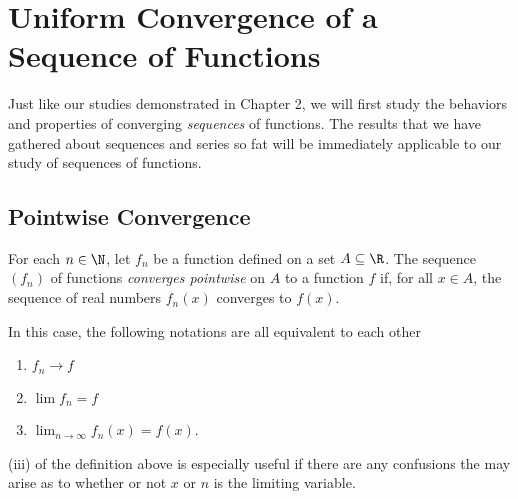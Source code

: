 \section{Uniform Convergence of a Sequence of Functions}


Just like our studies demonstrated in Chapter 2, we will first study the behaviors and properties of converging \textit{sequences} of functions. The results that we have gathered about sequences and series so fat will be immediately applicable to our study of sequences of functions.

\subsection{Pointwise Convergence} 

\begin{tcolorbox}
\begin{defn}
For each \( n \in \N  \), let \( f_n \) be a function defined on a set \( A \subseteq \R  \). The sequence \( (f_n)  \) of functions \textit{converges pointwise }  on \( A  \) to a function \( f  \) if, for all \( x \in A  \), the sequence of real numbers \( f_n(x)  \) converges to \( f(x)  \). 

In this case, the following notations are all equivalent to each other
\begin{enumerate}
    \item[(i)] \( f_n \to f  \) 
    \item[(ii)] \( \lim f_n = f  \)
    \item[(iii)] \( \lim_{ n \to \infty  } f_n(x) = f(x)  \).
\end{enumerate}
\end{defn}
\end{tcolorbox}

(iii) of the definition above is especially useful if there are any confusions the may arise as to whether or not \( x  \) or \( n  \) is the limiting variable.


